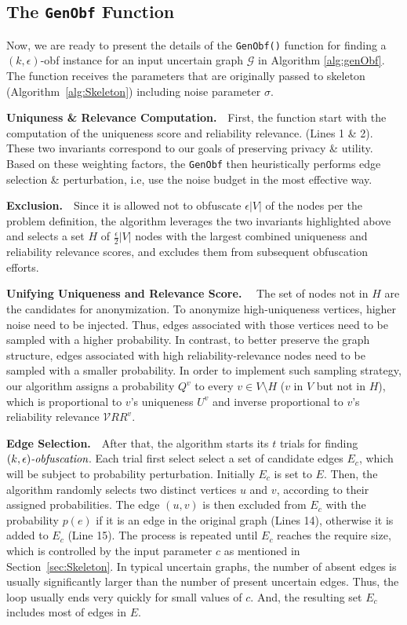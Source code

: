 \subsection{The \texttt{GenObf} Function}

Now, we are ready to present the details of the  \texttt{GenObf()} function for finding 
a $(k,\epsilon)$-obf instance for an input uncertain graph $\mathcal{G}$ in Algorithm \ref{alg:genObf}. The function receives the parameters that are originally passed to \SysName skeleton (Algorithm~\ref{alg:Skeleton}) including noise parameter $\sigma$.  



\textbf{Uniquness \& Relevance Computation.}~~First, the function start with the computation of the uniqueness score and reliability relevance. (Lines 1 \& 2).
These two invariants correspond to our goals of preserving privacy \& utility.   
Based on these weighting factors, the \texttt{GenObf} then heuristically performs edge selection \& perturbation, i.e, use the noise budget in the most effective way. 


\textbf{Exclusion.}~~Since it is allowed not to obfuscate $\epsilon|V|$ of the nodes per the problem definition, the algorithm leverages the two invariants highlighted above and selects a set $H$ of $\frac{\epsilon}{2}|V|$ nodes with the largest combined uniqueness and reliability relevance scores, and excludes them from subsequent obfuscation efforts. 



\textbf{Unifying Uniqueness and Relevance Score.}~~
The set of nodes not in $H$ are the candidates  for anonymization. 
To anonymize high-uniqueness vertices, higher noise need to be injected.
Thus, edges associated with those vertices need to be sampled with a higher probability. 
In contrast, to better preserve the graph structure, edges associated with high reliability-relevance nodes  need to be sampled with a smaller probability.
In order to implement such sampling strategy, our algorithm assigns a probability $Q^{v}$ to every $v \in V \setminus H$ ($v$ in $V$ but not in $H$), 
which is proportional to $v$'s uniqueness $U^{v}$ and inverse proportional to $v$'s reliability relevance $\mathcal{V}RR^{v}$. 

 

\textbf{Edge Selection.}~~After that, the algorithm starts its $t$ trials for finding $\textit{$(k,\epsilon)$-obfuscation}$. Each trial first select  select a set of candidate edges $E_{c}$, which will be subject to probability perturbation.
Initially $E_{c}$ is set to $E$. Then, the algorithm randomly selects two distinct vertices $u$ and $v$, according to their assigned probabilities. 
The edge $(u,v)$ is then excluded from $E_{c}$ with the probability $p(e)$ if it is an edge in the original graph (Lines 14), 
otherwise it is added to $E_{c}$ (Line 15).  
The process is repeated until $E_{c}$ reaches the require size, which is controlled by the input parameter $c$ as mentioned in Section~\ref{sec:Skeleton}. 
In typical uncertain graphs, the number of absent edges is usually significantly larger than the number of present uncertain edges. 
Thus, the loop usually ends very quickly for small values of $c$. And, the resulting set $E_{c}$ includes most of edges in $E$. 

